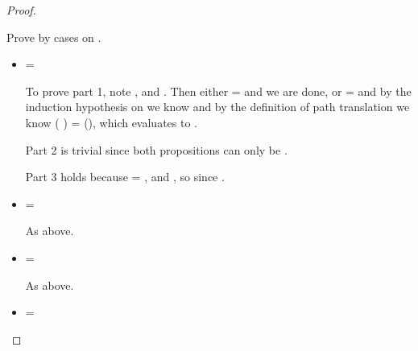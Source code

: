 \begin{lemma}
\begin{proof}
\begin{case}[B-Delta]
\begin{itemize}
\begin{subcase}[T-App]
\begin{itemize}
\begin{subcase}[\const{} = \classconst]
    Prove by cases on .

        \begin{itemize}
          \item[] \begin{subcase}[\val{2} = \classvalue{\class{}} {\protect\overrightarrow {\classfieldpair{\fld{i}} {\val{i}}}}]
                    \val{} = \class{}

                    To prove part 1,
                    note
                     {\object{}},
                    and .
                    Then either \object{} = \emptyobject{} and we are done,
                    or \object{} = {} and
                    by the induction hypothesis on  we know \inopenv {\openv{}} {} {}
                    and by the definition of path translation we know
                    {\openv{}}({\pth {\classpe{}} {}}) = {\appexp {\classconst{}} {{\openv{}}()}},
                    which evaluates to \val{}.

                    Part 2 is trivial since both propositions can only be \topprop{}.
                    
                    Part 3 holds because 
                    \val{} = \class{},
                    and
                    ,
                    so
                    {\judgementtwo{}{\val{}}{\ty{}}}
                    since
                    {\judgementtwo{}{\class{}}{\Union{\Nil}{\Class}}}.
                  \end{subcase}
          \item[] \begin{subcase}[\val{2} = \class{}] \val{} = \Class{}

              As above.
                  \end{subcase}
          \item[] \begin{subcase}[\val{2} = \true{}] \val{} = \Boolean{}

              As above.
                  \end{subcase}
          \item[] \begin{subcase}[\val{2} = \false{}] \val{} = \Boolean{}



\end{subcase}
\end{itemize}
\end{subcase}
\end{itemize}
\end{subcase}
\end{itemize}
\end{case}
\end{proof}
\end{lemma}
